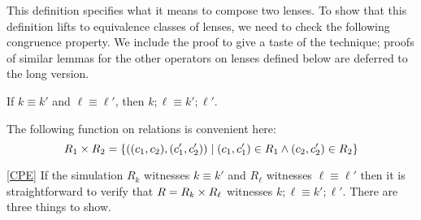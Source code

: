 \begin{defn}[$R$-similarity]
\begin{theorem}
This definition specifies what it means to compose two  lenses.
To show that this definition lifts to equivalence classes of lenses, we
need to check the following congruence property. \iffull\else We 
include the proof to give a taste of the technique; 
proofs of similar lemmas for the other operators on lenses 
defined below are deferred to the long version.\fi

\begin{lemma}\label{CPE}
If $k \equiv k'$ and $\ell \equiv \ell'$, then $k;\ell \equiv k';\ell'$.
\end{lemma}

\begin{definition}
The following function on relations is convenient here:
\[R_1 \times R_2 = \{((c_1,c_2),(c_1',c_2'))\;|\;(c_1,c_1') \in R_1 \land
(c_2,c_2') \in R_2\}\]
\end{definition}

\begin{pfof}{\ref{CPE}}
  If the simulation $R_k$ witnesses $k\equiv k'$ and $R_\ell$ witnesses
  $\ell\equiv \ell'$ then it is straightforward to verify that $R = R_k
  \times R_\ell$ witnesses $k;\ell \equiv k';\ell'$. There are three
  things to show.

  \begin{longenum}


\end{longenum}
\end{pfof}
\end{theorem}
\end{defn}
